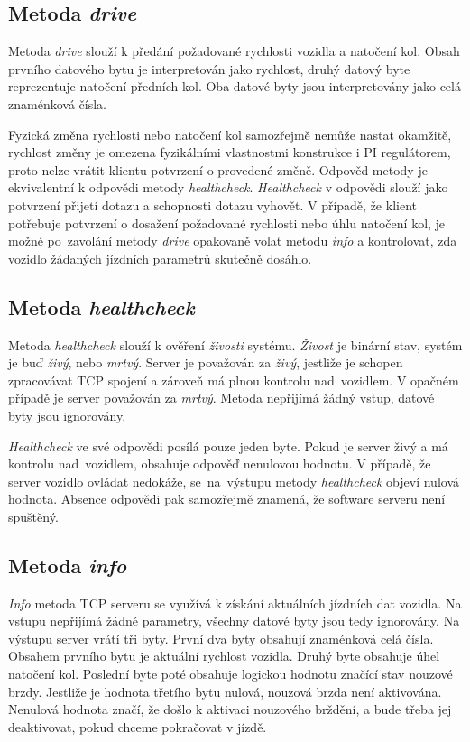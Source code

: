 \documentclass[czech, bachelor]{diploma}
\begin{document}
\subsection{Metoda \emph{drive}}
Metoda \emph{drive} slouží k předání požadované rychlosti vozidla a natočení kol. Obsah prvního datového bytu je interpretován
jako rychlost, druhý datový byte reprezentuje natočení předních kol. Oba datové byty jsou interpretovány jako celá znaménková
čísla.

Fyzická změna rychlosti nebo natočení kol samozřejmě nemůže nastat okamžitě, rychlost změny je omezena fyzikálními vlastnostmi
konstrukce i PI regulátorem\cite{pid-controller-source}, proto nelze vrátit klientu potvrzení o provedené změně. Odpověd metody
je ekvivalentní k odpovědi metody \emph{healthcheck}. \emph{Healthcheck} v odpovědi slouží jako potvrzení přijetí dotazu a
schopnosti dotazu vyhovět. V případě, že klient potřebuje potvrzení o dosažení požadované rychlosti nebo úhlu natočení kol, je
možné po~zavolání metody \emph{drive} opakovaně volat metodu \emph{info} a kontrolovat, zda vozidlo žádaných jízdních parametrů
skutečně dosáhlo.

\subsection{Metoda \emph{healthcheck}}
Metoda \emph{healthcheck} slouží k ověření \emph{živosti} systému. \emph{Živost} je binární stav, systém je buď \emph{živý}, nebo
\emph{mrtvý}. Server je považován za \emph{živý}, jestliže je schopen zpracovávat TCP spojení a zároveň má plnou kontrolu
nad~vozidlem. V opačném případě je server považován za \emph{mrtvý}. Metoda nepřijímá žádný vstup, datové byty jsou ignorovány.

\emph{Healthcheck} ve své odpovědi posílá pouze jeden byte. Pokud je server živý a má kontrolu nad~vozidlem, obsahuje odpověď
nenulovou hodnotu. V případě, že server vozidlo ovládat nedokáže, se~na~výstupu metody \emph{healthcheck} objeví nulová hodnota.
Absence odpovědi pak samozřejmě znamená, že software serveru není spuštěný.

\subsection{Metoda \emph{info}}
\emph{Info} metoda TCP serveru se využívá k získání aktuálních jízdních dat vozidla. Na vstupu nepřijímá žádné parametry, všechny
datové byty jsou tedy ignorovány. Na výstupu server vrátí tři byty. První dva byty obsahují znaménková celá čísla. Obsahem prvního
bytu je aktuální rychlost vozidla. Druhý byte obsahuje úhel natočení kol. Poslední byte poté obsahuje logickou hodnotu značící
stav nouzové brzdy. Jestliže je hodnota třetího bytu nulová, nouzová brzda není aktivována. Nenulová hodnota značí, že došlo
k aktivaci nouzového brždění, a bude třeba jej deaktivovat, pokud chceme pokračovat v jízdě.
\end{document}

